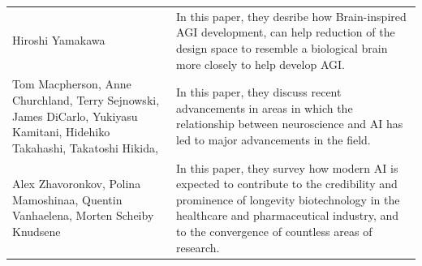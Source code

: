 \documentclass{article}
\begin{document}
\begin{table}
\begin{tabular}{ |p{5cm}|p{10cm}|  }
    Hiroshi Yamakawa & In this paper, they desribe how Brain-inspired AGI development, can help reduction of the design space to resemble a biological brain more closely to help develop AGI. \\

    Tom Macpherson, Anne Churchland, Terry Sejnowski, James DiCarlo, Yukiyasu Kamitani, Hidehiko Takahashi, Takatoshi Hikida, & In this paper, they discuss recent advancements in areas in which the relationship between neuroscience and AI has led to major advancements in the field. \\

    Alex Zhavoronkov, Polina Mamoshinaa, Quentin Vanhaelena, Morten Scheiby Knudsene & In this paper, they survey how modern AI is expected to contribute to the credibility and prominence of longevity biotechnology in the healthcare and pharmaceutical industry, and to the convergence of countless areas of research. \\

     
    \hline
    \end{tabular}
\end{table}
    
\end{document}
